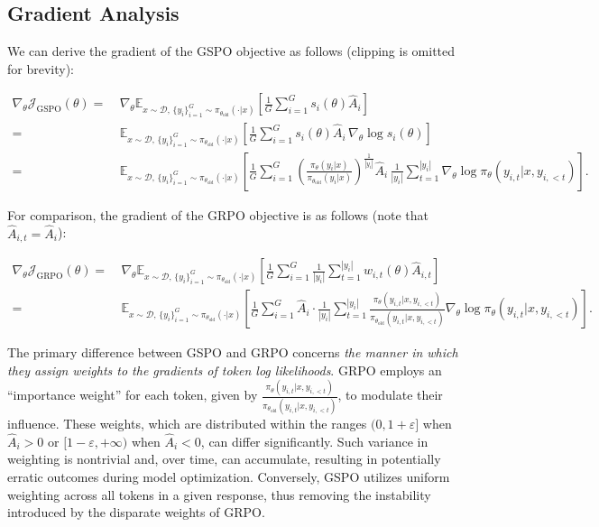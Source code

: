 \subsection{Gradient Analysis}
\label{subsec:gradient}

We can derive the gradient of the GSPO objective as follows (clipping is omitted for brevity):

\begin{align}
\nabla_{\theta} \mathcal{J}_\text{GSPO} (\theta)
=&\ 
\nabla_{\theta} \mathbb{E}_{ x \sim \mathcal{D},\, \{y_i\}_{i=1}^G \sim \pi_{\theta_\text{old}}( \cdot | x) }
\left[ 
\frac{1}{G} \sum_{i=1}^{G} s_{i}(\theta) \widehat{A}_{i}
\right] \\
= &\ 
\mathbb{E}_{ x \sim \mathcal{D},\, \{y_i\}_{i=1}^G \sim \pi_{\theta_\text{old}}( \cdot | x) }
\left[ 
\frac{1}{G} \sum_{i=1}^{G}
s_{i}(\theta) \widehat{A}_{i}
\, \nabla_{\theta} \log s_{i}(\theta)
\right] \\
=&\ 
\mathbb{E}_{ x \sim \mathcal{D},\, \{y_i\}_{i=1}^G \sim \pi_{\theta_\text{old}}( \cdot | x) }
\left[ 
\frac{1}{G} \sum_{i=1}^{G} 
\left( \frac{ \pi_{\theta} (y_i | x) }{ \pi_{\theta_\text{old}} (y_i | x)} \right)^{\frac{1}{|y_i|}} \widehat{A}_{i} 
\, \frac{1}{|y_i|} \sum_{t=1}^{|y_i|} \nabla_{\theta} \log \pi_{\theta} (y_{i,t} | x, y_{i,<t}) 
\right].
\label{equ:gspo_grad}
\end{align}

For comparison, the gradient of the GRPO objective is as follows (note that $\widehat{A}_{i,t} = \widehat{A}_{i}$):

\begin{align}
\nabla_{\theta} \mathcal{J}_\text{GRPO} (\theta) 
=&\
\nabla_{\theta} \mathbb{E}_{ x \sim \mathcal{D},\, \{y_i\}_{i=1}^G \sim \pi_{\theta_\text{old}}( \cdot | x) }
\left[ \frac{1}{G} \sum_{i=1}^{G} \frac{1}{|y_i|} \sum_{t=1}^{|y_i|} 
w_{i,t}(\theta) \widehat{A}_{i,t}
\right] \\
=&\
\mathbb{E}_{ x \sim \mathcal{D},\, \{y_i\}_{i=1}^G \sim \pi_{\theta_\text{old}}( \cdot | x) }
\left[
\frac{1}{G} \sum_{i=1}^{G} \widehat{A}_{i} 
\cdot \frac{1}{|y_i|} \sum_{t=1}^{|y_i|} 
\frac{ \pi_{\theta}(y_{i,t} | x, y_{i,<t}) }{ \pi_{\theta_\text{old}}(y_{i,t} | x, y_{i,<t}) }
\nabla_{\theta} \log \pi_{\theta}(y_{i,t} | x, y_{i,<t})
\right].
\end{align}

The primary difference between GSPO and GRPO concerns \textit{the manner in which they assign weights to the gradients of token log likelihoods}. GRPO employs an ``importance weight'' for each token, given by $\frac{ \pi_{\theta} (y_{i,t} | x, y_{i,<t}) }{ \pi_{\theta_\text{old}} (y_{i,t} | x,y_{i,<t})}$, to modulate their influence. These weights, which are distributed within the ranges $(0, 1+\varepsilon]$ when $\widehat{A}_{i} >0$ or $[1-\varepsilon, +\infty)$ when $\widehat{A}_{i} < 0$, can differ significantly. Such variance in weighting is nontrivial and, over time, can accumulate, resulting in potentially erratic outcomes during model optimization. Conversely, GSPO utilizes uniform weighting across all tokens in a given response, thus removing the instability introduced by the disparate weights of GRPO.

